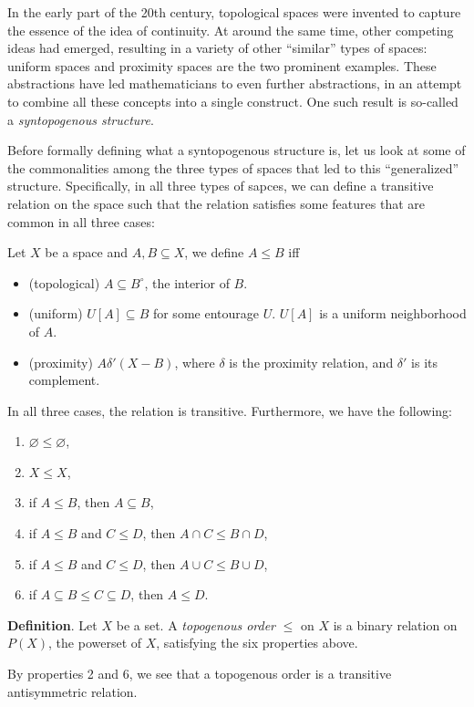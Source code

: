 \documentclass[12pt]{article}
\begin{document}
In the early part of the 20th century, topological spaces were invented to capture the essence of the idea of continuity.  At around the same time, other competing ideas had emerged, resulting in a variety of other ``similar'' types of spaces: uniform spaces and proximity spaces are the two prominent examples.  These abstractions have led mathematicians to even further abstractions, in an attempt to combine all these concepts into a single construct.  One such result is so-called a \emph{syntopogenous structure}.

Before formally defining what a syntopogenous structure is, let us look at some of the commonalities among the three types of spaces that led to this ``generalized'' structure.  Specifically, in all three types of sapces, we can define a transitive relation on the space such that the relation satisfies some features that are common in all three cases:

Let $X$ be a space and $A,B\subseteq X$, we define $A\le B$ iff
\begin{itemize}  
\item (topological) 
$A\subseteq B^{\circ}$, the interior of $B$.
\item (uniform)
$U[A]\subseteq B$ for some entourage $U$.  $U[A]$ is a uniform neighborhood of $A$.
\item (proximity)
$A\delta' (X-B)$, where $\delta$ is the proximity relation, and $\delta'$ is its complement.
\end{itemize}

In all three cases, the relation is transitive.  Furthermore, we have the following:
\begin{enumerate}
\item $\varnothing\le \varnothing$,
\item $X\le X$,
\item if $A\le B$, then $A\subseteq B$,
\item if $A\le B$ and $C\le D$, then $A\cap C\le B\cap D$,
\item if $A\le B$ and $C\le D$, then $A\cup C\le B\cup D$,
\item if $A\subseteq B\le C\subseteq D$, then $A\le D$.
\end{enumerate}

\textbf{Definition}.  Let $X$ be a set.  A \emph{topogenous order} $\le$ on $X$ is a binary relation on $P(X)$, the powerset of $X$, satisfying the six properties above.

By properties 2 and 6, we see that a topogenous order is a transitive antisymmetric relation.
\end{document}
